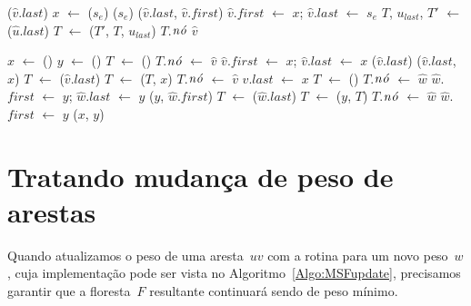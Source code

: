 \begin{algorithm}[htb]
\caption{\LCOCycle($\hat v$, $s_e$)}
\label{Algo:LCOCycle}
\begin{algorithmic}[1]
\State \linkcutEvert($\hat v$.$last$)
\State\Return
\EndIf
\State $x$ $\gets$ \linkcutParent($s_e$)
\State \linkcutDelEdge($s_e$)
\State \linkcutAddEdge($\hat v$.$last$, $\hat v$.$first$)
\State $\hat v$.$first$ $\gets$ $x$; $\hat v$.$last$ $\gets$ $s_e$
\State $T$, $u_{last}$, $T'$ $\gets$ \treapSplit($\hat u$.$last$)
\State $T$ $\gets$ \treapJoin($T'$, $T$, $u_{last}$)
\State $T$.$\mathit{n\acute{o}}$ $\hat v$
\end{algorithmic}
\end{algorithm}


\begin{algorithm}[htb]
\caption{\LCOLink($\hat v$, $\hat w$)}
\label{Algo:LCOLink}
\begin{algorithmic}[1]
\State $x$ $\gets$ \linkcutCreate()
\State $y$ $\gets$ \linkcutCreate()
  \State $T$ $\gets$ \treapCreate()
  \State $T$.$\mathit{n\acute{o}}$ $\gets$ $\hat v$
  \State $\hat v$.$first$ $\gets$ $x$; $\hat v$.$last$ $\gets$ $x$ 
\Else
  \State \linkcutEvert($\hat v$.$last$)
  \State \linkcutAddEdge($\hat v$.$last$, $x$)
  \State $T$ $\gets$ \treapGetRoot($\hat v$.$last$)
  \State $T$ $\gets$ \treapJoin($T$, $x$)
  \State $T$.$\mathit{n\acute{o}}$ $\gets$ $\hat v$
  \State $\hat v$.$last$ $\gets$ $x$
\EndIf
{}
  \State $T$ $\gets$ \treapCreate()
  \State $T$.$\mathit{n\acute{o}}$ $\gets$ $\hat w$
  \State $\hat w$.$first$ $\gets$ $y$; $\hat w$.$last$ $\gets$ $y$ 
\Else
  \State \linkcutAddEdge($y$, $\hat w$.$first$)
  \State $T$ $\gets$ \treapGetRoot($\hat w$.$last$)
  \State $T$ $\gets$ \treapJoin($y$, $T$)
  \State $T$.$\mathit{n\acute{o}}$ $\gets$ $\hat w$
  \State $\hat w$.$first$ $\gets$ $y$
\EndIf
\State \linkcutAddEdge($x$, $y$)
\end{algorithmic}
\end{algorithm}
\section{Tratando mudança de peso de arestas}

Quando atualizamos o peso de uma aresta~$uv$ com a rotina \MSFupdate{} para um novo peso~$w$, cuja implementação pode ser vista no Algoritmo~\ref{Algo:MSFupdate}, precisamos garantir que a floresta~$F$ resultante continuará sendo  de peso mínimo.

